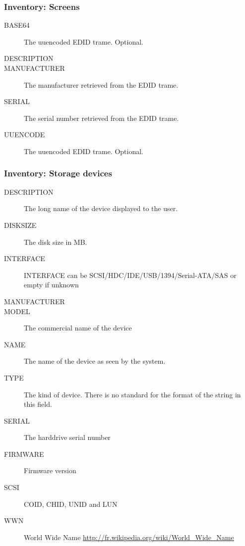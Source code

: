 \documentclass{beamer}
\begin{document}
\begin{frame}
\frametitle{Inventory: Screens}
\begin{description}
      \item[BASE64] The uuencoded EDID trame. Optional.
      \item[DESCRIPTION]
      \item[MANUFACTURER] The manufacturer retrieved from the EDID trame.
      \item[SERIAL] The serial number retrieved from the EDID trame.
      \item[UUENCODE] The uuencoded EDID trame. Optional.
\end{description}
\end{frame}
\begin{frame}
\frametitle{Inventory: Storage devices}
\begin{description}
      \item[DESCRIPTION] The long name of the device displayed to the user.
      \item[DISKSIZE] The disk size in MB.
      \item[INTERFACE] INTERFACE can be SCSI/HDC/IDE/USB/1394/Serial-ATA/SAS or empty if unknown
      \item[MANUFACTURER]
      \item[MODEL] The commercial name of the device
      \item[NAME] The name of the device as seen by the system.%
      \item[TYPE] The kind of device. There is no standard for the format of the string in this field.
      \item[SERIAL] The harddrive serial number
      \item[FIRMWARE] Firmware version
      \item[SCSI] COID, CHID, UNID and LUN
      \item[WWN] World Wide Name \url{http://fr.wikipedia.org/wiki/World\_Wide\_Name}
\end{description}

\end{frame}
\end{document}
